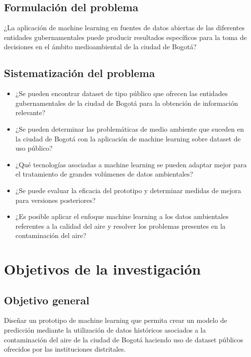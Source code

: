 \subsection{Formulación del problema}

¿La aplicación de machine learning en fuentes de datos abiertas de las diferentes entidades gubernamentales puede producir resultados específicos para la toma de decisiones en        el ámbito medioambiental de la ciudad de Bogotá?

\subsection{Sistematización del problema}

\begin{itemize}
	\item ¿Se pueden encontrar dataset de tipo público que ofrecen las entidades gubernamentales de la ciudad de Bogotá para la obtención de información relevante? 
	\item ¿Se pueden determinar las problemáticas de medio ambiente que suceden en la ciudad de Bogotá con la aplicación de machine learning sobre dataset de uso público? 
	\item ¿Qué tecnologías asociadas a machine learning se pueden adaptar mejor para el tratamiento de grandes volúmenes de datos ambientales? 
	\item ¿Se puede evaluar la eficacia del prototipo y determinar medidas de mejora para versiones posteriores? 
	\item ¿Es posible aplicar el enfoque machine learning a los datos ambientales referentes a la calidad del aire y resolver los problemas presentes en la contaminación del aire?
\end{itemize}

\section{Objetivos de la investigación}

\subsection{Objetivo general}

Diseñar un prototipo de machine learning que permita crear un modelo de predicción mediante la utilización de datos históricos asociados a la contaminación del aire de la ciudad de Bogotá haciendo uso de dataset públicos ofrecidos por las instituciones distritales.

